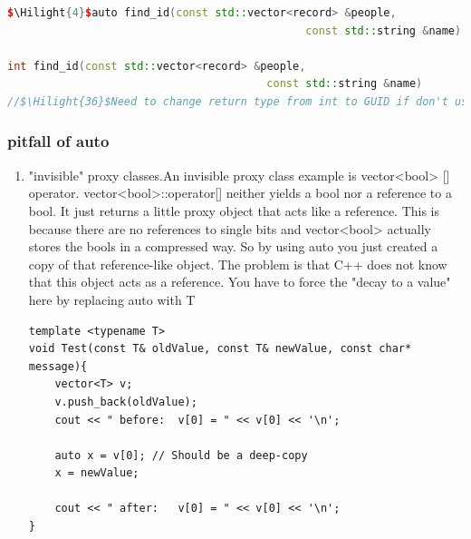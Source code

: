 \documentclass[a4paper,11pt,twoside]{book}
\newcommand{\Hilight}[1]{\makebox[0pt][l]{\color{yellow}\rule[-3pt]{#1em}{11pt}}}
\newcommand{\Hilight}[1]{}
\begin{document}
\begin{itemize}
\begin{enumerate}
\begin{lstlisting}[frame=single, language=c++, mathescape=true]
$\Hilight{4}$auto find_id(const std::vector<record> &people, 
                                              const std::string &name)

int find_id(const std::vector<record> &people,
                                        const std::string &name)
//$\Hilight{36}$Need to change return type from int to GUID if don't use auto
\end{lstlisting}

	\end{enumerate}
\end{itemize}
	
\subsubsection{pitfall of auto}
	\begin{enumerate}
		\item "invisible" proxy classes.An invisible proxy class example is vector<bool> [] operator. vector<bool>::operator[] neither yields a bool nor a reference to a bool. It just returns a little proxy object that acts like a reference. This is because there are no references to single bits and vector<bool> actually stores the bools in a compressed way. So by using auto you just created a copy of that reference-like object. The problem is that C++ does not know that this object acts as a reference. You have to force the "decay to a value" here by replacing auto with T
\begin{lstlisting}
template <typename T>
void Test(const T& oldValue, const T& newValue, const char* message){
	vector<T> v;
	v.push_back(oldValue);
	cout << " before:  v[0] = " << v[0] << '\n';
	
	auto x = v[0]; // Should be a deep-copy
	x = newValue;

	cout << " after:   v[0] = " << v[0] << '\n';
}


\end{lstlisting}
\end{enumerate}
\end{document}
